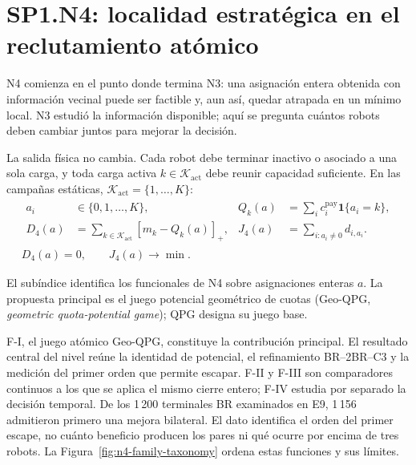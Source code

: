 



\section*{SP1.N4: localidad estratégica en el reclutamiento atómico}
\enlargethispage{5\baselineskip}

N4 comienza en el punto donde termina N3: una asignación entera obtenida con
información vecinal puede ser factible y, aun así, quedar atrapada en un mínimo
local. N3 estudió la información disponible; aquí se pregunta cuántos robots
deben cambiar juntos para mejorar la decisión.

La salida física no cambia. Cada robot debe terminar inactivo o asociado a una
sola carga, y toda carga activa $k\in\mathcal K_{\mathrm{act}}$ debe reunir
capacidad suficiente. En las campañas estáticas,
$\mathcal K_{\mathrm{act}}=\{1,\ldots,K\}$:
\begin{equation}
\label{eq:n4-common-problem}
\begin{gathered}
\begin{aligned}
a_i&\in\{0,1,\ldots,K\}, &
Q_k(a)&=\sum_i c_i^{\mathrm{pay}}\mathbf 1\{a_i=k\},\\[-1mm]
D_4(a)&=\sum_{k\in\mathcal K_{\mathrm{act}}}[m_k-Q_k(a)]_+, &
J_4(a)&=\sum_{i:a_i\ne0}d_{i,a_i}.
\end{aligned}
\\[-1mm]
D_4(a)=0,\qquad J_4(a)\rightarrow\min .
\end{gathered}
\end{equation}

El subíndice identifica los funcionales de N4 sobre asignaciones enteras $a$.
La propuesta principal es el juego potencial geométrico de cuotas (Geo-QPG,
\emph{geometric quota-potential game}); QPG designa su juego base.

F-I, el juego atómico Geo-QPG, constituye la contribución principal. El
resultado central del nivel reúne la identidad de potencial, el refinamiento
BR--2BR--C3 y la medición del primer orden que permite escapar. F-II y F-III son
comparadores continuos a los que se aplica el mismo cierre entero; F-IV estudia
por separado la decisión temporal.
De los 1\,200 terminales BR examinados en E9, 1\,156 admitieron primero una
mejora bilateral. El dato identifica el orden del primer escape, no cuánto
beneficio producen los pares ni qué ocurre por encima de tres robots. La
Figura~\ref{fig:n4-family-taxonomy} ordena estas funciones y sus límites.

